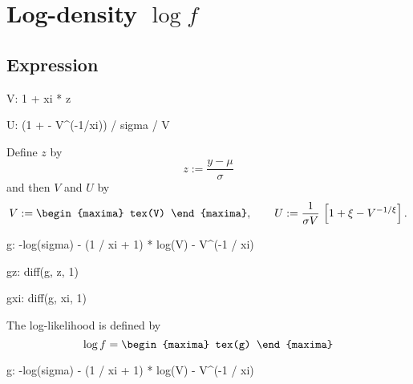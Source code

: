


\section{Log-density $\log f$}

\subsection{Expression}

\begin{maxima}
  V: 1 + xi * z
\end{maxima}
\begin{maxima}
  U: (1 + \xi - V^(-1/xi)) / sigma / V
\end{maxima}

Define $z$ by
$$
z := \frac{y - \mu}{\sigma}
$$
and then $V$ and $U$ by 
\[
V := 
\begin{maxima}
tex(V)
\end{maxima}, \qquad U:= \frac{1}{\sigma V}\,\left[ 1 + \xi - V^{-1/\xi}\right]. 
\]
\begin{maxima}
  g: -log(sigma) - (1 / xi + 1) * log(V) - V^(-1 / xi)
\end{maxima}
%
\begin{maxima}
  gz: diff(g, z, 1)
\end{maxima}%
\begin{maxima}
  gxi: diff(g, xi, 1)
\end{maxima}%

The log-likelihood is defined by
\[
\log f = 
\begin{maxima}
  tex(g)
\end{maxima}
\]

\begin{maxima}
  g: -log(sigma) - (1 / xi + 1) * log(V) - V^(-1 / xi)
\end{maxima}

